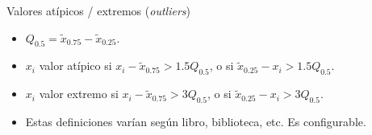 \documentclass[table]{beamer}
\begin{document}
\begin{frame}
\begin{center}
    \end{center}
    \begin{block}{Valores atípicos / extremos (\emph{outliers})}
        \begin{itemize}
            \item $Q_{0.5} = \tilde{x}_{0.75} - \tilde{x}_{0.25}$.
            \item $x_{i}$ valor atípico si $x_{i} - \tilde{x}_{0.75} > 1.5 Q_{0.5}$, o si
                $\tilde{x}_{0.25} - x_{i} > 1.5 Q_{0.5}$.
            \item $x_{i}$ valor extremo si $x_{i} - \tilde{x}_{0.75} > 3 Q_{0.5}$, o si
                $\tilde{x}_{0.25} - x_{i} > 3 Q_{0.5}$.
            \item Estas definiciones varían según libro, biblioteca, etc. Es configurable.
        \end{itemize}
    \end{block}
\end{frame}
\end{document}

